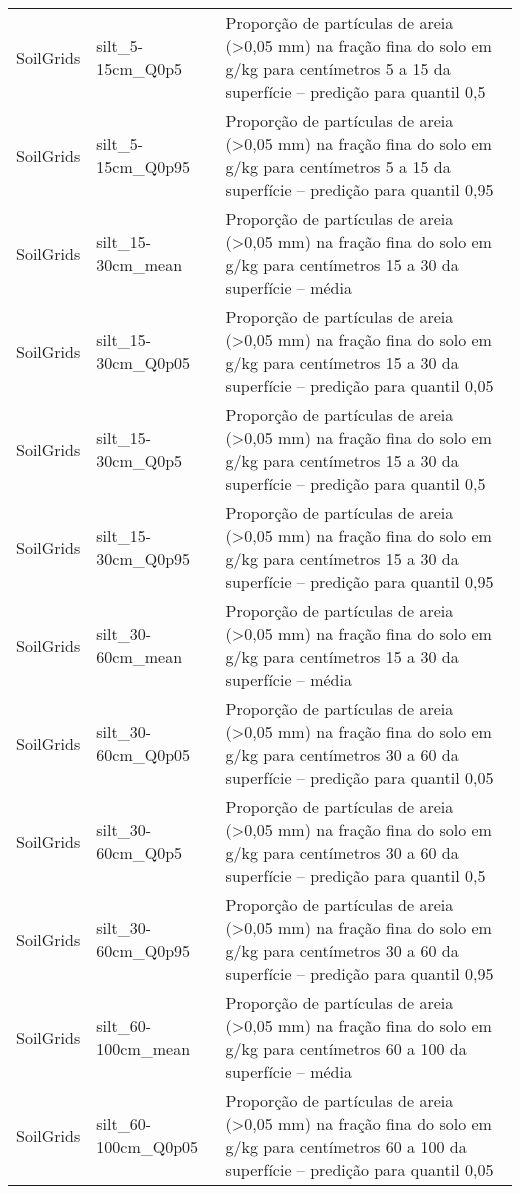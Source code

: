 \begin{longtable}{@{} p{4cm} p{4cm} p{8cm} @{}}
	SoilGrids &
	silt\_5-15cm\_Q0p5 &
	Proporção de partículas de areia (\textgreater 0,05 mm) na fração fina do solo em g/kg para centímetros 5 a 15 da superfície – predição para quantil 0,5 \\
	SoilGrids &
	silt\_5-15cm\_Q0p95 &
	Proporção de partículas de areia (\textgreater 0,05 mm) na fração fina do solo em g/kg para centímetros 5 a 15 da superfície – predição para quantil 0,95 \\
	SoilGrids &
	silt\_15-30cm\_mean &
	Proporção de partículas de areia (\textgreater 0,05 mm) na fração fina do solo em g/kg para centímetros 15 a 30 da superfície – média \\
	SoilGrids &
	silt\_15-30cm\_Q0p05 &
	Proporção de partículas de areia (\textgreater 0,05 mm) na fração fina do solo em g/kg para centímetros 15 a 30 da superfície – predição para quantil 0,05 \\
	SoilGrids &
	silt\_15-30cm\_Q0p5 &
	Proporção de partículas de areia (\textgreater 0,05 mm) na fração fina do solo em g/kg para centímetros 15 a 30 da superfície – predição para quantil 0,5 \\
	SoilGrids &
	silt\_15-30cm\_Q0p95 &
	Proporção de partículas de areia (\textgreater 0,05 mm) na fração fina do solo em g/kg para centímetros 15 a 30 da superfície – predição para quantil 0,95 \\
	SoilGrids &
	silt\_30-60cm\_mean &
	Proporção de partículas de areia (\textgreater 0,05 mm) na fração fina do solo em g/kg para centímetros 15 a 30 da superfície – média \\
	SoilGrids &
	silt\_30-60cm\_Q0p05 &
	Proporção de partículas de areia (\textgreater 0,05 mm) na fração fina do solo em g/kg para centímetros 30 a 60 da superfície – predição para quantil 0,05 \\
	SoilGrids &
	silt\_30-60cm\_Q0p5 &
	Proporção de partículas de areia (\textgreater 0,05 mm) na fração fina do solo em g/kg para centímetros 30 a 60 da superfície – predição para quantil 0,5 \\
	SoilGrids &
	silt\_30-60cm\_Q0p95 &
	Proporção de partículas de areia (\textgreater 0,05 mm) na fração fina do solo em g/kg para centímetros 30 a 60 da superfície – predição para quantil 0,95 \\
	SoilGrids &
	silt\_60-100cm\_mean &
	Proporção de partículas de areia (\textgreater 0,05 mm) na fração fina do solo em g/kg para centímetros 60 a 100 da superfície – média \\
	SoilGrids &
	silt\_60-100cm\_Q0p05 &
	Proporção de partículas de areia (\textgreater 0,05 mm) na fração fina do solo em g/kg para centímetros 60 a 100 da superfície – predição para quantil 0,05 \\

\end{longtable}

